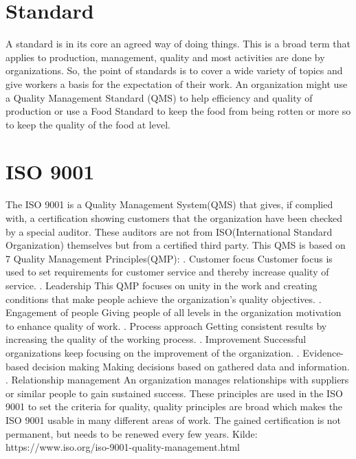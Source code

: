 \section{Standard}
A standard is in its core an agreed way of doing things. This is a broad term that applies to production, management, quality and most activities are done by organizations. So, the point of standards is to cover a wide variety of topics and give workers a basis for the expectation of their work. An organization might use a Quality Management Standard (QMS) to help efficiency and quality of production or use a Food Standard to keep the food from being rotten or more so to keep the quality of the food at level.

\section{ISO 9001}
The ISO 9001 is a Quality Management System(QMS) that gives, if complied with, a certification showing customers that the organization have been checked by a special auditor. These auditors are not from ISO(International Standard Organization) themselves but from a certified third party.
This QMS is based on 7 Quality Management Principles(QMP):
. Customer focus
\newline
Customer focus is used to set requirements for customer service and thereby increase quality of service.
. Leadership
\newline
This QMP focuses on unity in the work and creating conditions that make people achieve the organization's quality objectives.
. Engagement of people
\newline
Giving people of all levels in the organization motivation to enhance quality of work.
. Process approach
\newline
Getting consistent results by increasing the quality of the working process.
. Improvement
\newline
Successful organizations keep focusing on the improvement of the organization.
. Evidence-based decision making
\newline
Making decisions based on gathered data and information.
. Relationship management
\newline
An organization manages relationships with suppliers or similar people to gain sustained success.
\newline
These principles are used in the ISO 9001 to set the criteria for quality,
quality principles are broad which makes the ISO 9001 usable in many different areas of work.
The gained certification is not permanent, but needs to be renewed every few years.
\newline
Kilde: https://www.iso.org/iso-9001-quality-management.html	 	 	
\newline
